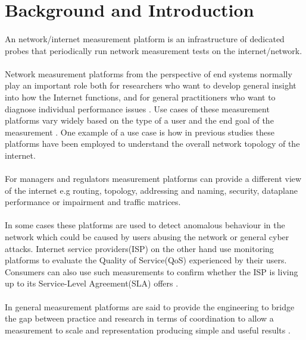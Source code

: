 \section{Background and Introduction}
\paragraph{}
An network/internet measurement platform is an infrastructure of dedicated probes that periodically run network measurement tests on the internet/network\cite{7076582}.

\paragraph{}
 Network measurement platforms from the perspective of end systems normally play an important role both for researchers who want to develop general insight into how the Internet functions, and for general practitioners who want to diagnose individual performance issues \cite{Dhawan:2012:FBN:2398776.2398786}. Use cases of these measurement platforms vary widely based on the type of a user and the end goal of the measurement \cite{Ford:2018:RWR:3243157.3243167}. One example of a use case is how in  previous studies these platforms have been employed to understand the overall network topology of the internet\cite{7076582}.
\paragraph{}
For managers and regulators measurement platforms can provide a different view of the internet e.g routing, topology, addressing and naming, security, dataplane performance or impairment and traffic matrices\cite{Ford:2018:RWR:3243157.3243167}.
\paragraph{}
In some cases these platforms are used to detect anomalous behaviour in the network which could be caused by users abusing the network or general cyber attacks. Internet service providers(ISP) on the other hand use monitoring platforms to evaluate the Quality of Service(QoS) experienced by their users\cite{7076582}. Consumers can also use such measurements to confirm whether the ISP is living up to its Service-Level Agreement(SLA) offers \cite{7076582}.
\paragraph{}
In general measurement platforms are said to provide the engineering to bridge the gap between practice and research in terms of coordination to allow a measurement to scale  and representation producing simple and useful results \cite{Ford:2018:RWR:3243157.3243167}.

